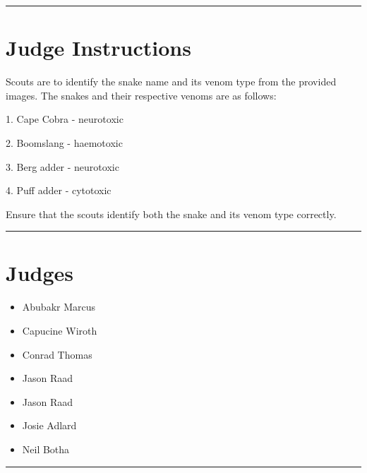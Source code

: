 \documentclass[10pt]{article}
\begin{document}
	\vspace{0.5cm}
	\hrule
	\vspace{0.5cm}

		\section*{Judge Instructions}
		Scouts are to identify the snake name and its venom type from the provided images. The snakes and their respective venoms are as follows:



1. Cape Cobra - neurotoxic

2. Boomslang - haemotoxic

3. Berg adder - neurotoxic

4. Puff adder - cytotoxic



Ensure that the scouts identify both the snake and its venom type correctly.


\vspace{0.5cm}
	\hrule
	\vspace{0.5cm}
		\section*{\faUsers \: Judges}

		

	\begin{multicols}{2}

		\begin{itemize}
									\item Abubakr Marcus
									\item Capucine Wiroth
									\item Conrad Thomas
									\item Jason Raad
						\end{itemize}

		\vfill\null
		\columnbreak

		\begin{itemize}
									\item Jason Raad
									\item Josie Adlard
									\item Neil Botha
						\end{itemize}

		\vfill\null

		\end{multicols}



			\vspace{0.5cm}
	\hrule
	\vspace{0.5cm}
\end{document}

